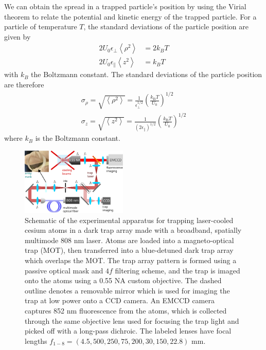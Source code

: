 We can obtain the spread in a trapped particle's position by using the Virial theorem to relate the potential and kinetic energy of the trapped particle. For a particle of temperature $T$, the standard deviations of the particle position are given by
\begin{equation}
\begin{aligned}
2 U_{0} \epsilon_{\perp}\left\langle\rho^{2}\right\rangle &=2 k_{B} T \\
2 U_{0} \epsilon_{\|}\left\langle z^{2}\right\rangle &=k_{B} T
\end{aligned}
\end{equation}
with $k_B$ the Boltzmann constant. The standard deviations of the particle position are therefore
\begin{equation}
\begin{gathered}
\sigma_{\rho}=\sqrt{\left\langle\rho^{2}\right\rangle}=\frac{1}{\epsilon_{\perp}^{1 / 2}}\left(\frac{k_{\mathrm{B}} T}{U_{0}}\right)^{1 / 2} \\
\sigma_{z}=\sqrt{\left\langle z^{2}\right\rangle}=\frac{1}{\left(2 \epsilon_{\|}\right)^{1 / 2}}\left(\frac{k_{\mathrm{B}} T}{U_{0}}\right)^{1 / 2}
\end{gathered}
\end{equation}
where $k_B$ is the Boltzmann constant.

\begin{figure}[!t]
    \centering
    \includegraphics[width=0.45\textwidth]{Images/figure2.eps}
    \caption{Schematic of the experimental apparatus for trapping laser-cooled cesium atoms in a dark trap array made with a broadband, spatially multimode 808 nm laser. Atoms are loaded into a magneto-optical trap (MOT), then transferred into a blue-detuned dark trap array which overlaps the MOT. The trap array pattern is formed using a passive optical mask and $4f$ filtering scheme, and the trap is imaged onto the atoms using a 0.55 NA custom objective. The dashed outline denotes a removable mirror which is used for imaging the trap at low power onto a CCD camera. An EMCCD camera captures 852 nm fluorescence from the atoms, which is collected through the same objective lens used for focusing the trap light and picked off with a long-pass dichroic. The labeled lenses have focal lengths $f_{1-8} = (4.5,500,250,75,200,30,150,22.8)$ mm.}
    \label{fig:schem}
\end{figure}

